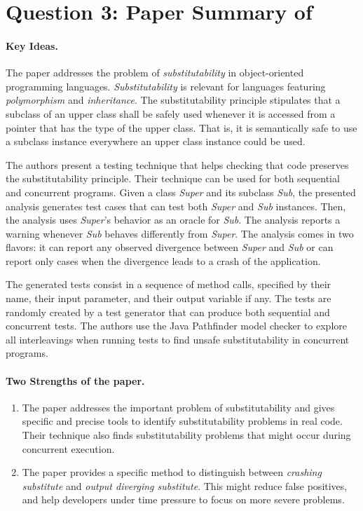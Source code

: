 \section*{Question 3: Paper Summary of \cite{Pradel:2013:ATS}}

\newcommand{\mysub}{substitutability}
\newcommand{\mySub}{Substitutability}

\paragraph{Key Ideas.}
The paper addresses the problem of \textit{\mysub} in 
object-oriented programming languages. \textit{\mySub} is relevant
for languages featuring \textit{polymorphism} and \textit{inheritance}.
The \mysub{} principle stipulates that a subclass of an upper
class shall be safely used whenever it is accessed from a
pointer that has the type of the upper class. That is, it is
semantically safe to use a subclass instance everywhere an
upper class instance could be used.

The authors present a testing technique that helps checking
that code preserves the \mysub{} principle. Their technique
can be used for both sequential and concurrent programs.
Given a class \textit{Super} and its subclass \textit{Sub}, the
presented analysis generates test cases that can test both
\textit{Super} and \textit{Sub} instances. Then, the analysis
uses \textit{Super}'s behavior as an oracle for \textit{Sub}.
The analysis reports a warning whenever \textit{Sub} behaves
differently from \textit{Super}. The analysis comes in two
flavors: it can report any observed divergence between \textit{Super}
and \textit{Sub} or can report only cases when the divergence 
leads to a crash of the application.

The generated tests consist in a sequence of method calls,
specified by their name, their input parameter, and their
output variable if any. The tests are randomly created by
a test generator that can produce both sequential and
concurrent tests. The authors use the Java Pathfinder
model checker to explore all interleavings when running
tests to find unsafe \mysub{} in concurrent programs.

\paragraph{Two Strengths of the paper.}
\begin{enumerate}
\item The paper addresses the important problem of \mysub{} and
gives specific and precise tools to identify \mysub{} problems
in real code. Their technique also finds \mysub{} problems
that might occur during concurrent execution.

\item The paper provides a specific method to distinguish
between \textit{crashing substitute} and \textit{output diverging
substitute}. This might reduce false positives, and help developers
under time pressure to focus on more severe problems.
\end{enumerate}

